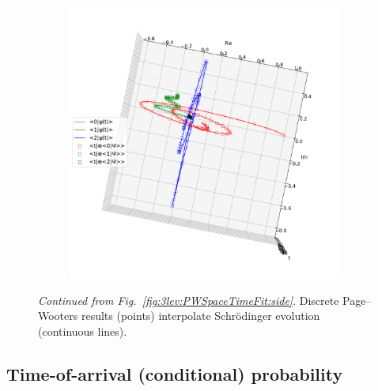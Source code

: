 \begin{figure}[p]\ContinuedFloat %
  \begin{fullpage}
    \begin{subfigure}{\textwidth}
      \includegraphics[width=\textwidth]{img/3ldetect/PWSpaceTimeFit_top.pdf}
      \label{fig:3lev:PWSpaceTimeFit:top}
    \end{subfigure}
    \caption{
      \textit{Continued from Fig.~\ref{fig:3lev:PWSpaceTimeFit:side}}.
      Discrete Page--Wooters results (points)
      interpolate
      Schr\"{o}dinger
      evolution (continuous lines).
    }
  \end{fullpage}
\end{figure}

\subsection{Time-of-arrival (conditional) probability}

